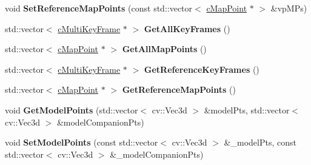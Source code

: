 \begin{DoxyCompactItemize}
\item 
void {\bfseries Set\+Reference\+Map\+Points} (const std\+::vector$<$ \hyperlink{classMultiColSLAM_1_1cMapPoint}{c\+Map\+Point} $\ast$ $>$ \&vp\+M\+Ps)\hypertarget{classMultiColSLAM_1_1cMap_af596714d8cd4bddb3e50c62507f41475}{}\label{classMultiColSLAM_1_1cMap_af596714d8cd4bddb3e50c62507f41475}

\item 
std\+::vector$<$ \hyperlink{classMultiColSLAM_1_1cMultiKeyFrame}{c\+Multi\+Key\+Frame} $\ast$ $>$ {\bfseries Get\+All\+Key\+Frames} ()\hypertarget{classMultiColSLAM_1_1cMap_ac0270cf762b6d74c7890ab34f27d6ff9}{}\label{classMultiColSLAM_1_1cMap_ac0270cf762b6d74c7890ab34f27d6ff9}

\item 
std\+::vector$<$ \hyperlink{classMultiColSLAM_1_1cMapPoint}{c\+Map\+Point} $\ast$ $>$ {\bfseries Get\+All\+Map\+Points} ()\hypertarget{classMultiColSLAM_1_1cMap_a9d81b28dc19dd8a90d369c70681c62d6}{}\label{classMultiColSLAM_1_1cMap_a9d81b28dc19dd8a90d369c70681c62d6}

\item 
std\+::vector$<$ \hyperlink{classMultiColSLAM_1_1cMultiKeyFrame}{c\+Multi\+Key\+Frame} $\ast$ $>$ {\bfseries Get\+Reference\+Key\+Frames} ()\hypertarget{classMultiColSLAM_1_1cMap_ac6f18d0fc9ec7f693f21090af5a4cb20}{}\label{classMultiColSLAM_1_1cMap_ac6f18d0fc9ec7f693f21090af5a4cb20}

\item 
std\+::vector$<$ \hyperlink{classMultiColSLAM_1_1cMapPoint}{c\+Map\+Point} $\ast$ $>$ {\bfseries Get\+Reference\+Map\+Points} ()\hypertarget{classMultiColSLAM_1_1cMap_ad4f5ecb66699d432276079c494b90c34}{}\label{classMultiColSLAM_1_1cMap_ad4f5ecb66699d432276079c494b90c34}

\item 
void {\bfseries Get\+Model\+Points} (std\+::vector$<$ cv\+::\+Vec3d $>$ \&model\+Pts, std\+::vector$<$ cv\+::\+Vec3d $>$ \&model\+Companion\+Pts)\hypertarget{classMultiColSLAM_1_1cMap_a2777c7281c7e5e834e444183250001dd}{}\label{classMultiColSLAM_1_1cMap_a2777c7281c7e5e834e444183250001dd}

\item 
void {\bfseries Set\+Model\+Points} (const std\+::vector$<$ cv\+::\+Vec3d $>$ \&\+\_\+model\+Pts, const std\+::vector$<$ cv\+::\+Vec3d $>$ \&\+\_\+model\+Companion\+Pts)\hypertarget{classMultiColSLAM_1_1cMap_ac4d6e9a79ac3790896ca6f0c153d5a5b}{}\label{classMultiColSLAM_1_1cMap_ac4d6e9a79ac3790896ca6f0c153d5a5b}


\end{DoxyCompactItemize}
